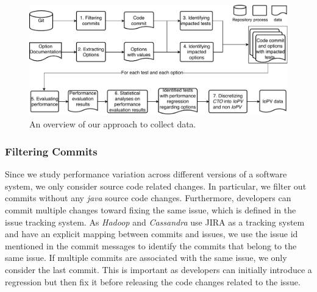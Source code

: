 \begin{figure}[tbh]
	\centering
		\includegraphics[width=.9\textwidth]{Figures/overview.pdf}
	\caption{An overview of our approach to collect data.} 
	\label{fig:overview} 
\end{figure}

\subsubsection{Filtering Commits}

Since we study performance variation across different versions of a software system, we only consider source code related changes. In particular, we filter out commits without any \emph{java} source code changes. %
Furthermore, %
developers can commit multiple changes toward fixing the same issue, which is defined in the issue tracking system. As \emph{Hadoop} and \emph{Cassandra} use JIRA as a tracking system and have an explicit mapping between commits and issues, we use the issue id mentioned in the commit messages to identify the commits that belong to the same issue. If multiple commits are associated with the same issue, we only consider the last commit. This is important as developers can initially introduce a regression but then fix it before releasing the code changes related to the issue. 




